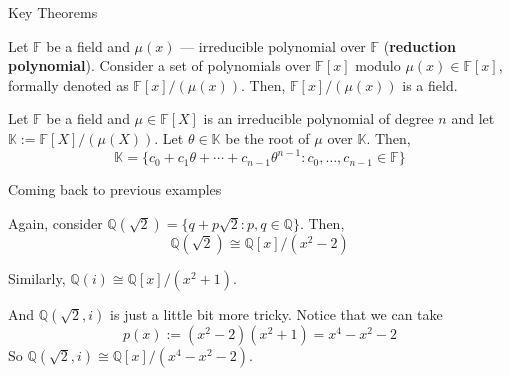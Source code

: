 \documentclass{zkdl-presentation-template}
\begin{document}
    \begin{frame}{Key Theorems}

        \begin{theorem}
            Let $\mathbb{F}$ be a field and $\mu(x)$ --- irreducible polynomial over $\mathbb{F}$ (\textbf{reduction polynomial}). Consider a set of polynomials over $\mathbb{F}[x]$ modulo $\mu(x) \in \mathbb{F}[x]$, formally denoted as $\mathbb{F}[x]/(\mu(x))$. Then, $\mathbb{F}[x]/(\mu(x))$ is a field.
        \end{theorem}

        \begin{theorem}
            Let $\mathbb{F}$ be a field and $\mu \in \mathbb{F}[X]$ is an irreducible polynomial of degree $n$ and let $\mathbb{K} := \mathbb{F}[X]/(\mu(X))$. Let $\theta \in \mathbb{K}$ be the root of $\mu$ over $\mathbb{K}$. Then,
            \begin{equation*}
                \mathbb{K} = \{c_0+c_1\theta+\cdots+c_{n-1}\theta^{n-1}: c_0,\dots,c_{n-1} \in \mathbb{F}\}
            \end{equation*}
        \end{theorem}
    \end{frame}

    \begin{frame}{Coming back to previous examples}
        \begin{example}
            Again, consider $\mathbb{Q}(\sqrt{2}) = \{q+p\sqrt{2}: p,q \in \mathbb{Q}\}$. Then,
            \begin{equation*}
                \mathbb{Q}(\sqrt{2}) \cong \mathbb{Q}[x]/(x^2-2)
            \end{equation*}
        \end{example}

        \begin{example}
            Similarly, $\mathbb{Q}(i) \cong \mathbb{Q}[x]/(x^2+1)$.
        \end{example}

        \begin{example}
            And $\mathbb{Q}(\sqrt{2}, i)$ is just a little bit more tricky. Notice that we can take
            \begin{equation*}
                p(x) := (x^2-2)(x^2+1) = x^4-x^2-2
            \end{equation*}
            So $\mathbb{Q}(\sqrt{2}, i) \cong \mathbb{Q}[x]/(x^4-x^2-2)$.
        \end{example}
    \end{frame}
\end{document}
